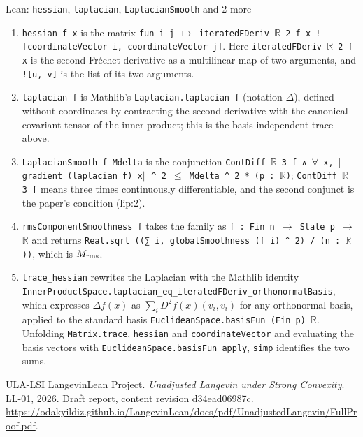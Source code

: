 \documentclass[11pt,a4paper]{article}
\begin{document}
\begin{leanbox}{Lean: \texttt{hessian}, \texttt{laplacian}, \texttt{LaplacianSmooth} and 2 more}
\begin{enumerate}
\item \texttt{hessian f x} is the matrix \texttt{fun i j \ensuremath{\mapsto} iterated\allowbreak{}FDeriv \ensuremath{\mathbb R} 2 f x ![coordinate\allowbreak{}Vector i, coordinate\allowbreak{}Vector j]}. Here \texttt{iterated\allowbreak{}FDeriv \ensuremath{\mathbb R} 2 f x} is the second Fréchet derivative as a multilinear map of two arguments, and \texttt{![u, v]} is the list of its two arguments.

\item \texttt{laplacian f} is Mathlib's \texttt{Laplacian.\allowbreak{}laplacian f} (notation \(\Delta\)), defined without coordinates by contracting the second derivative with the canonical covariant tensor of the inner product; this is the basis-independent trace above.

\item \texttt{Laplacian\allowbreak{}Smooth f Mdelta} is the conjunction \texttt{Cont\allowbreak{}Diff \ensuremath{\mathbb R} 3 f ∧ \ensuremath{\forall} x, \ensuremath{\Vert}gradient (laplacian f) x\ensuremath{\Vert} \textasciicircum{} 2 \ensuremath{\le} Mdelta \textasciicircum{} 2 * (p : \ensuremath{\mathbb R})}; \texttt{Cont\allowbreak{}Diff \ensuremath{\mathbb R} 3 f} means three times continuously differentiable, and the second conjunct is the paper's condition (lip:2).

\item \texttt{rms\allowbreak{}Component\allowbreak{}Smoothness f} takes the family as \texttt{f : Fin n \ensuremath{\to} State p \ensuremath{\to} \ensuremath{\mathbb R}} and returns \texttt{Real.\allowbreak{}sqrt ((∑ i, global\allowbreak{}Smoothness (f i) \textasciicircum{} 2) /\allowbreak{} (n : \ensuremath{\mathbb R}))}, which is \(M_{\rm rms}\).

\item \texttt{trace\_\allowbreak{}hessian} rewrites the Laplacian with the Mathlib identity \texttt{Inner\allowbreak{}Product\allowbreak{}Space.\allowbreak{}laplacian\_\allowbreak{}eq\_\allowbreak{}iterated\allowbreak{}FDeriv\_\allowbreak{}orthonormal\allowbreak{}Basis}, which expresses \(\Delta f(x)\) as \(\sum_iD^2f(x)(v_i,v_i)\) for any orthonormal basis, applied to the standard basis \texttt{Euclidean\allowbreak{}Space.\allowbreak{}basis\allowbreak{}Fun (Fin p) \ensuremath{\mathbb R}}. Unfolding \texttt{Matrix.\allowbreak{}trace}, \texttt{hessian} and \texttt{coordinate\allowbreak{}Vector} and evaluating the basis vectors with \texttt{Euclidean\allowbreak{}Space.\allowbreak{}basis\allowbreak{}Fun\_\allowbreak{}apply}, \texttt{simp} identifies the two sums.

\end{enumerate}
\end{leanbox}

\begin{thebibliography}{ULA-LSI}
LangevinLean Project. \emph{Unadjusted Langevin under Strong Convexity}. LL-01, 2026. Draft report, content revision d34ead06987c. \url{https://odakyildiz.github.io/LangevinLean/docs/pdf/UnadjustedLangevin/FullProof.pdf}.
\end{thebibliography}
\end{document}
